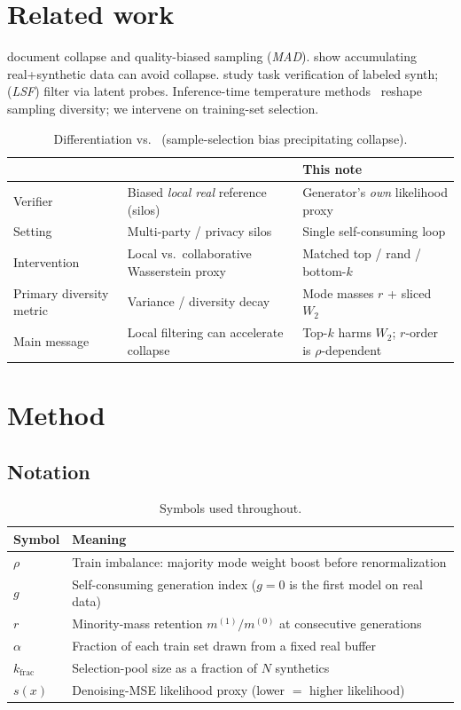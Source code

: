 \documentclass[11pt]{article}
\begin{document}
\section{Related work}
\citet{shumailov2023,alemohammad2023} document collapse and quality-biased sampling (\emph{MAD}).
\citet{gerstgrasser2024} show accumulating real+synthetic data can avoid collapse.
\citet{feng2024} study task verification of labeled synth; \citet{cai2025} (\emph{LSF}) filter via latent probes.
Inference-time temperature methods~\citep{xu2025,li2026} reshape sampling diversity; we intervene on training-set selection.

\begin{table}[t]
\centering
\caption{Differentiation vs.\ \citet{qiao2026} (sample-selection bias precipitating collapse).}
\label{tab:qiao}
\begin{tabular}{lll}
\toprule
 & \citet{qiao2026} & This note \\
\midrule
Verifier & Biased \emph{local real} reference (silos) & Generator's \emph{own} likelihood proxy \\
Setting & Multi-party / privacy silos & Single self-consuming loop \\
Intervention & Local vs.\ collaborative Wasserstein proxy & Matched top / rand / bottom-$k$ \\
Primary diversity metric & Variance / diversity decay & Mode masses $r$ + sliced $W_2$ \\
Main message & Local filtering can accelerate collapse & Top-$k$ harms $W_2$; $r$-order is $\rho$-dependent \\
\bottomrule
\end{tabular}
\end{table}

\section{Method}
\subsection{Notation}
\begin{table}[h]
\centering
\caption{Symbols used throughout.}
\label{tab:notation}
\begin{tabular}{ll}
\toprule
Symbol & Meaning \\
\midrule
$\rho$ & Train imbalance: majority mode weight boost before renormalization \\
$g$ & Self-consuming generation index ($g{=}0$ is the first model on real data) \\
$r$ & Minority-mass retention $m^{(1)}/m^{(0)}$ at consecutive generations \\
$\alpha$ & Fraction of each train set drawn from a fixed real buffer \\
$k_{\mathrm{frac}}$ & Selection-pool size as a fraction of $N$ synthetics \\
$s(x)$ & Denoising-MSE likelihood proxy (lower $=$ higher likelihood) \\
\bottomrule
\end{tabular}
\end{table}
\end{document}
